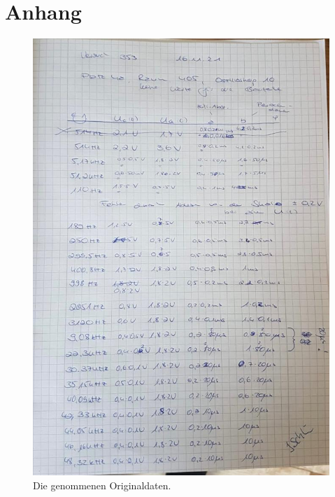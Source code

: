\section{Anhang}
\label{sec:Anhang}

\begin{figure}
    \centering
    \includegraphics[scale=0.4]{content/origDaten.png}
    \caption{Die genommenen Originaldaten.}
    \label{fig:origDaten}
\end{figure}

